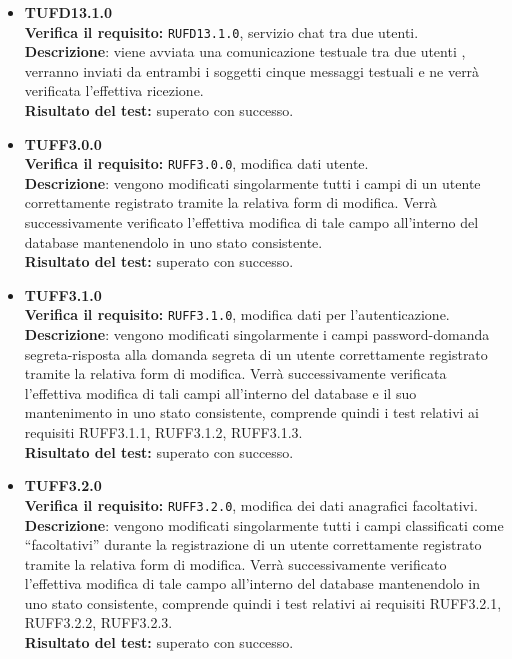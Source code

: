 \begin{itemize}
\item \textbf{TUFD13.1.0}\\
\textbf{Verifica il requisito:} \texttt{RUFD13.1.0}, servizio chat tra due utenti.\\
\textbf{Descrizione}: viene avviata una comunicazione testuale tra due utenti , verranno inviati da entrambi i soggetti cinque messaggi testuali e ne verrà verificata l'effettiva ricezione.\\
\textbf{Risultato del test:} superato con successo.

\item \textbf{TUFF3.0.0}\\
\textbf{Verifica il requisito:} \texttt{RUFF3.0.0}, modifica dati utente.\\
\textbf{Descrizione}: vengono modificati singolarmente tutti i campi di un utente  correttamente registrato tramite la relativa form di modifica. Verrà successivamente verificato l'effettiva modifica di tale campo all'interno del database mantenendolo in uno stato consistente.\\
\textbf{Risultato del test:} superato con successo.

\item \textbf{TUFF3.1.0}\\
\textbf{Verifica il requisito:} \texttt{RUFF3.1.0}, modifica dati per l'autenticazione.\\
\textbf{Descrizione}: vengono modificati singolarmente i campi password-domanda segreta-risposta alla domanda segreta di un utente  correttamente registrato tramite la relativa form di modifica. Verrà successivamente verificata l'effettiva modifica di tali campi all'interno del database e il suo mantenimento in uno stato consistente, comprende quindi i test relativi ai requisiti RUFF3.1.1, RUFF3.1.2, RUFF3.1.3.\\
\textbf{Risultato del test:} superato con successo.

\item \textbf{TUFF3.2.0}\\
\textbf{Verifica il requisito:} \texttt{RUFF3.2.0}, modifica dei dati anagrafici facoltativi.\\
\textbf{Descrizione}: vengono modificati singolarmente tutti i campi classificati come ``facoltativi'' durante la registrazione di un utente  correttamente registrato tramite la relativa form di modifica. Verrà successivamente verificato l'effettiva modifica di tale campo all'interno del database mantenendolo in uno stato consistente, comprende quindi i test relativi ai requisiti RUFF3.2.1, RUFF3.2.2, RUFF3.2.3.\\
\textbf{Risultato del test:} superato con successo.


\end{itemize}
